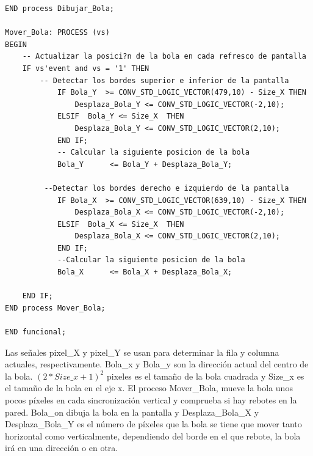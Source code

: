 \begin{lstlisting}
END process Dibujar_Bola;

Mover_Bola: PROCESS (vs)
BEGIN
	-- Actualizar la posici?n de la bola en cada refresco de pantalla
	IF vs'event and vs = '1' THEN
		-- Detectar los bordes superior e inferior de la pantalla
			IF Bola_Y  >= CONV_STD_LOGIC_VECTOR(479,10) - Size_X THEN
				Desplaza_Bola_Y <= CONV_STD_LOGIC_VECTOR(-2,10);
			ELSIF  Bola_Y <= Size_X  THEN
				Desplaza_Bola_Y <= CONV_STD_LOGIC_VECTOR(2,10);
			END IF;
			-- Calcular la siguiente posicion de la bola
			Bola_Y 	  	<= Bola_Y + Desplaza_Bola_Y;
			
		 --Detectar los bordes derecho e izquierdo de la pantalla
			IF Bola_X  >= CONV_STD_LOGIC_VECTOR(639,10) - Size_X THEN	
				Desplaza_Bola_X <= CONV_STD_LOGIC_VECTOR(-2,10);				
			ELSIF  Bola_X <= Size_X  THEN											
				Desplaza_Bola_X <= CONV_STD_LOGIC_VECTOR(2,10);
			END IF;
			--Calcular la siguiente posicion de la bola
			Bola_X 	  	<= Bola_X + Desplaza_Bola_X;
			
	END IF;
END process Mover_Bola;

END funcional;
\end{lstlisting}

Las señales pixel\_X y pixel\_Y se usan para determinar la fila y columna actuales, respectivamente. Bola\_x y Bola\_y 
son la dirección actual del centro de la bola. $(2*Size\_x +1)^2$ pixeles es el tamaño de la bola cuadrada y Size\_x es 
el tamaño de la bola en el eje x. El proceso Mover\_Bola, mueve la bola unos pocos píxeles en cada sincronización vertical 
y comprueba si hay rebotes en la pared. Bola\_on dibuja la bola en la pantalla y Desplaza\_Bola\_X y Desplaza\_Bola\_Y es 
el número de píxeles que la bola se tiene que mover tanto horizontal como verticalmente, dependiendo del borde en el que 
rebote, la bola irá en una dirección o en otra.

